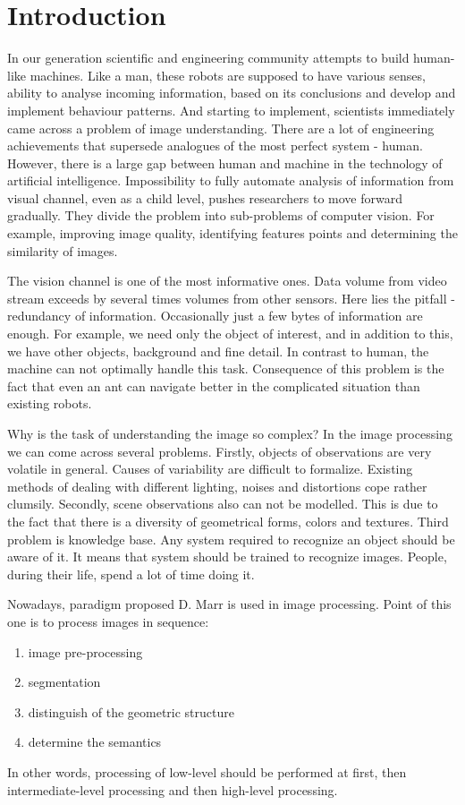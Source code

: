\documentclass[12pt,a4paper,oneside,titlepage]{article}
\begin{document}
\section*{Introduction}
In our generation scientific and engineering community attempts to build human-like machines.
Like a man, these robots are supposed to have various senses, ability to analyse incoming information, based on its conclusions and develop and implement behaviour patterns.
And starting to implement, scientists immediately came across a problem of image understanding.
There are a lot of engineering achievements that supersede analogues of the most perfect system - human.
However, there is a large gap between human and machine in the technology of artificial intelligence.
Impossibility to fully automate analysis of information from visual channel, even as a child level, pushes researchers to move forward gradually.
They divide the problem into sub-problems of computer vision. 
For example, improving image quality, identifying features points and determining the similarity of images.

The vision channel is one of the most informative ones.
Data volume from video stream exceeds by several times volumes from other sensors.
Here lies the pitfall - redundancy of information.
Occasionally just a few bytes of information are enough.
For example, we need only the object of interest, and in addition to this, we have other objects, background and fine detail.
In contrast to human, the machine can not optimally handle this task.
Consequence of this problem is the fact that even an ant can navigate better in the complicated situation than existing robots.

Why is the task of understanding the image so complex?
In the image processing we can come across several problems.
Firstly, objects of observations are very volatile in general.
Causes of variability are difficult to formalize.
Existing methods of dealing with different lighting, noises and distortions cope rather clumsily.
Secondly, scene observations also can not be modelled.
This is due to the fact that there is a diversity of geometrical forms, colors and textures.
Third problem is knowledge base.
Any system required to recognize an object should be aware of it.
It means that system should be trained to recognize images.
People, during their life, spend a lot of time doing it.

Nowadays, paradigm proposed D. Marr \cite{marr} is used in image processing.
Point of this one is to process images in sequence:
\begin{enumerate}
  \item image pre-processing
  \item segmentation
  \item distinguish of the geometric structure
  \item determine the semantics
\end{enumerate}
In other words, processing of low-level should be performed at first, then intermediate-level processing and then high-level processing.
\end{document}
